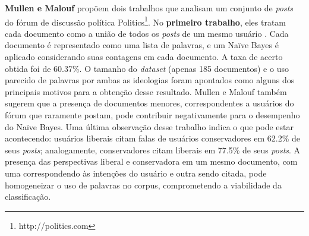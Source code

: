 \textbf{Mullen e Malouf} propõem dois trabalhos que analisam um conjunto de \emph{posts} do fórum de discussão política Politics\footnote{http://politics.com}. No \textbf{primeiro trabalho}, eles tratam cada documento como a união de todos os \emph{posts} de um mesmo usuário \cite{aaai-politics}. Cada documento é representado como uma lista de palavras, e um Naïve Bayes é aplicado considerando suas contagens em cada documento. A taxa de acerto obtida foi de 60.37\%. O tamanho do \emph{dataset} (apenas 185 documentos) e o uso parecido de palavras por ambas as ideologias foram apontados como alguns dos principais motivos para a obtenção desse resultado. Mullen e Malouf também sugerem que a presença de documentos menores, correspondentes a usuários do fórum que raramente postam, pode contribuir negativamente para o desempenho do Naïve Bayes. Uma última observação desse trabalho indica o que pode estar acontecendo: usuários liberais citam falas de usuários conservadores em 62.2\% de seus \emph{posts}; analogamente, conservadores citam liberais em 77.5\%  de seus \emph{posts}. A presença das perspectivas liberal e conservadora em um mesmo documento, com uma correspondendo às intenções do usuário e outra sendo citada, pode homogeneizar o uso de palavras no corpus, comprometendo a viabilidade da classificação.



